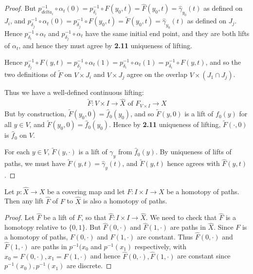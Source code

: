 \documentclass[10pt,a4paper]{article}
\begin{document}
\begin{proof}
But $p_{delta_i}^{-1}\circ\alpha_t(0)  = p_{\delta_i}^{-1}\circ F(y_0, t) = \hat{F}(y_0, t) = \hat{\gamma}_{y_0}(t)$ as defined on $J_i$, and $p_{\delta_j}^{-1}\circ \alpha_t(0) = p_{\delta_j}^{-1}\circ F(y_0, t) = \tilde{F}(y_0, t) = \hat{\gamma}_{y_0}(t)$ as defined on $J_j$. Hence $p_{\delta_i}^{-1}\circ \alpha_t$ and $p_{\delta_j}^{-1} \circ \alpha_t$ have the same initial end point, and they are both lifts of $\alpha_t$, and hence they must agree by \textbf{2.11} uniqueness of lifting.

Hence $p_{\delta_j}^{-1}\circ F(y,t) = p_{\delta_j}^{-1}\circ \alpha_t(1) = p_{\delta_i}^{-1}\circ \alpha_t(1) =  p _{\delta_i}^{-1}\circ F(y,t)$, and so the two definitions of $\tilde{F}$ on $V\times J_i$ and $V\times J_j$ agree on the overlap $V\times (J_1 \cap J_j)$.

Thus we have a well-defined continuous lifting:
\begin{align*}
\tilde{F} : V\times I \to \hat{X} \text{ of } F_{V\times I} \to X
\end{align*}
But by construction, $\tilde{F}(y_0,0) = \hat{f}_0 ( y_0)$, and so $\tilde{F}(y,0)$ is a lift of $f_0(y)$ for all $y\in V$, and $\tilde{F}(y_0,0) = \hat{f}_0(y_0)$. Hence by \textbf{2.11} uniqueness of lifting, $\tilde{F}(\cdot, 0)$ is $\hat{f}_0$ on $V$.

For each $y \in V$, $\tilde{F}(y, \cdot)$ is a lift of $\gamma_y$ from $\hat{f}_0(y)$. By uniqueness of lifts of paths, we must have $\tilde{F}(y,t) = \hat{\gamma}_y(t)$, and $\tilde{F}(y,t)$ hence agrees with $\hat{F}(y,t)$.
\end{proof}

\begin{corollary}
Let $p:\hat{X}\to X$ be a covering map and let $F:I\times I \to X$ be a homotopy of paths. Then any lift $\hat{F}$ of $F$ to $\hat{X}$ is also a homotopy of paths.
\end{corollary}
\begin{proof}
Let $\hat{F}$ be a lift of $F$, so that $\hat{F}:I\times I\to \hat{X}$. We need to check that $\hat{F}$ is a homotopy relative to $\{0,1\}$. But $\hat{F}(0,\cdot)$ and $\hat{F}(1,\cdot)$ are paths in $\hat{X}$. Since $F$ is a homotopy of paths, $F(0,\cdot)$ and $F(1,\cdot)$ are constant. Thus $\hat{F}(0, \cdot)$ and $\hat{F}(1,\cdot)$ are paths in $p^{-1}(x_0$ and $p^{-1}(x_1)$ respectively, with $x_0 = F(0,\cdot), x_1 = F(1,\cdot)$ and hence $\hat{F}(0,\cdot), \hat{F}(1,\cdot)$ are constant since $p^{-1}(x_0), p^{-1}(x_1)$ are discrete.
\end{proof}
\end{document}
